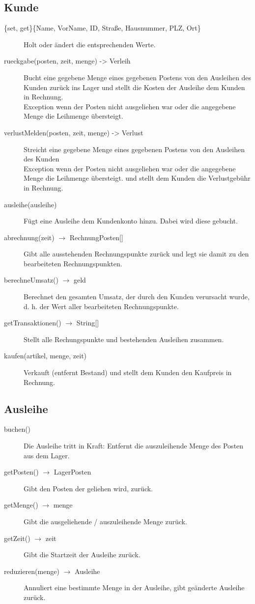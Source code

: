 \documentclass[a4paper,12pt,titlepage]{article}
\begin{document}
\subsection{Kunde}
\begin{description}
\item[\{set, get\}\{Name, VorName, ID, Straße, Hausnummer, PLZ, Ort\}]
Holt oder ändert die entsprechenden Werte.
\item[rueckgabe(posten, zeit, menge) -> Verleih]
Bucht eine gegebene Menge eines gegebenen Postens von den Ausleihen des Kunden zurück ins Lager
und stellt die Kosten der Ausleihe dem Kunden in Rechnung.\\
Exception wenn der Posten nicht ausgeliehen war oder die angegebene Menge die Leihmenge übersteigt.
\item[verlustMelden(posten, zeit, menge) -> Verlust]
Streicht eine gegebene Menge eines gegebenen Postens von den Ausleihen des Kunden\\
Exception wenn der Posten nicht ausgeliehen war oder die angegebene Menge die Leihmenge übersteigt.
und stellt dem Kunden die Verlustgebühr in Rechnung.
\item[ausleihe(ausleihe)]
Fügt eine Ausleihe dem Kundenkonto hinzu. Dabei wird diese gebucht.
\item[abrechnung(zeit) $\rightarrow$ RechnungPosten{[]}]
Gibt alle ausstehenden Rechnungspunkte zurück und legt sie damit zu den bearbeiteten Rechnungspunkten.
\item[berechneUmsatz() $\rightarrow$ geld]
Berechnet den gesamten Umsatz, der durch den Kunden verursacht wurde, d. h. der Wert aller bearbeiteten Rechnungspunkte.
\item[getTransaktionen() $\rightarrow$ String{[]}]
Stellt alle Rechungspunkte und bestehenden Ausleihen zusammen.
\item[kaufen(artikel, menge, zeit)]
Verkauft (entfernt Bestand) und stellt dem Kunden den Kaufpreis in Rechnung.
\end{description}
\subsection{Ausleihe}
\begin{description}
\item[buchen()]
Die Ausleihe tritt in Kraft: Entfernt die auszuleihende Menge des Posten aus dem Lager.
\item[getPosten() $\rightarrow$ LagerPosten]
Gibt den Posten der geliehen wird, zurück.
\item[getMenge() $\rightarrow$ menge]
Gibt die ausgeliehende / auszuleihende Menge zurück.
\item[getZeit() $\rightarrow$ zeit]
Gibt die Startzeit der Ausleihe zurück.
\item[reduzieren(menge) $\rightarrow$ Ausleihe]
Annuliert eine bestimmte Menge in der Ausleihe, gibt geänderte Ausleihe zurück.
\end{description}
\end{document}
